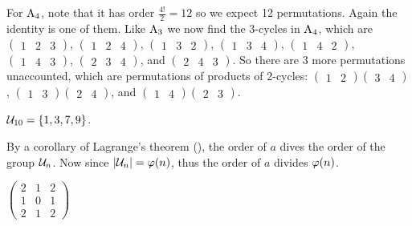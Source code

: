 \begin{questions}
    For $\mathrm{A}_{4}$, note that it has order $\frac{4!}{2} = 12$ so we expect 12 permutations. Again the identity is one of them. Like $\mathrm{A}_{3}$ we now find the 3-cycles in $\mathrm{A}_{4}$, which are $\begin{pmatrix}1&2&3\end{pmatrix}$, $\begin{pmatrix}1&2&4\end{pmatrix}$, $\begin{pmatrix}1&3&2\end{pmatrix}$, $\begin{pmatrix}1&3&4\end{pmatrix}$, \linebreak $\begin{pmatrix}1&4&2\end{pmatrix}$, $\begin{pmatrix}1&4&3\end{pmatrix}$, $\begin{pmatrix}2&3&4\end{pmatrix}$, and $\begin{pmatrix}2&4&3\end{pmatrix}$. So there are 3 more permutations unaccounted, which are permutations of products of 2-cycles: $\begin{pmatrix}1&2\end{pmatrix}\begin{pmatrix}3&4\end{pmatrix}$, $\begin{pmatrix}1&3\end{pmatrix}\begin{pmatrix}2&4\end{pmatrix}$, and $\begin{pmatrix}1&4\end{pmatrix}\begin{pmatrix}2&3\end{pmatrix}$.

    \item $\mathcal{U}_{10} = \{1, 3, 7, 9\}$.

    \item By a corollary of Lagrange's theorem (), the order of $a$ dives the order of the group $\mathcal{U}_{n}$. Now since $|\mathcal{U}_{n}| = \varphi(n)$, thus the order of $a$ divides $\varphi(n)$.

    \item $\begin{pmatrix}2&1&2\\1&0&1\\2&1&2\end{pmatrix}$


\end{questions}

